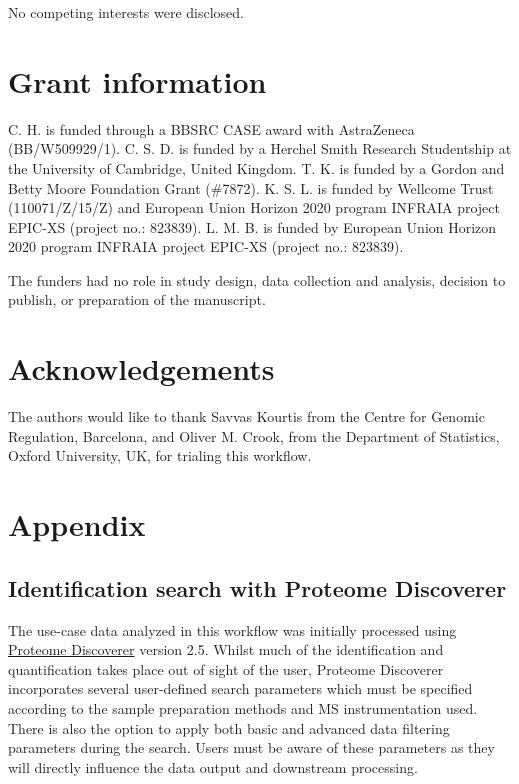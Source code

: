 \documentclass[9pt,a4paper,]{extarticle}
\begin{document}
No competing interests were disclosed.

\hypertarget{grant-information}{%
\section{Grant information}\label{grant-information}}

C. H. is funded through a BBSRC CASE award with AstraZeneca (BB/W509929/1). C. S.
D. is funded by a Herchel Smith Research Studentship at the University of
Cambridge, United Kingdom. T. K. is funded by a Gordon and Betty Moore Foundation
Grant (\#7872). K. S. L. is funded by Wellcome Trust (110071/Z/15/Z) and European
Union Horizon 2020 program INFRAIA project EPIC-XS (project no.: 823839). L. M.
B. is funded by European Union Horizon 2020 program INFRAIA project EPIC-XS
(project no.: 823839).

The funders had no role in study design, data collection and analysis, decision
to publish, or preparation of the manuscript.

\hypertarget{acknowledgements}{%
\section{Acknowledgements}\label{acknowledgements}}

The authors would like to thank Savvas Kourtis from the Centre for Genomic
Regulation, Barcelona, and Oliver M. Crook, from the Department of Statistics,
Oxford University, UK, for trialing this workflow.

\hypertarget{appendix}{%
\section{Appendix}\label{appendix}}

\hypertarget{identification-search-with-proteome-discoverer}{%
\subsection{Identification search with Proteome Discoverer}\label{identification-search-with-proteome-discoverer}}

The use-case data analyzed in this workflow was initially processed using
\href{https://www.thermofisher.com/uk/en/home/industrial/mass-spectrometry/liquid-chromatography-mass-spectrometry-lc-ms/lc-ms-software/multi-omics-data-analysis/proteome-discoverer-software.html}{Proteome Discoverer}
version 2.5. Whilst much of the identification and quantification takes place
out of sight of the user, Proteome Discoverer incorporates several user-defined
search parameters which must be specified according to the sample preparation
methods and MS instrumentation used. There is also the option to apply both
basic and advanced data filtering parameters during the search. Users must be
aware of these parameters as they will directly influence the data output and
downstream processing.
\end{document}
